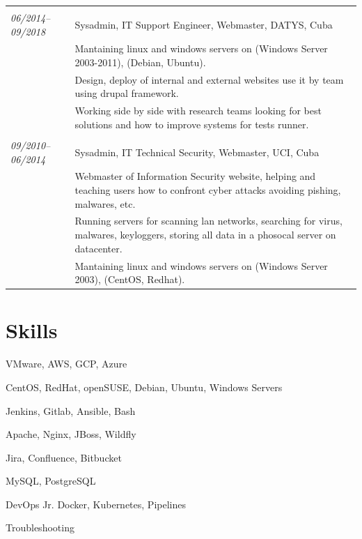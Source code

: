 \documentclass[a4paper,12pt]{article}
\begin{document}
\begin{tabular}{p{2.9cm}| p{16cm}}
\multicolumn{2}{c}{} \\  
\emph{06/2014–09/2018} & Sysadmin, IT Support Engineer, Webmaster, DATYS, Cuba \\
\textsc{}&\footnotesize{Mantaining linux and windows servers on (Windows Server 2003-2011), (Debian, Ubuntu).}\\
\textsc{}&\footnotesize{Design, deploy of internal and external websites use it by team using drupal framework.}\\
\textsc{}&\footnotesize{Working side by side with research teams looking for best solutions and how to improve systems for tests runner.}\\

\multicolumn{2}{c}{} \\  
\emph{09/2010–06/2014} & Sysadmin, IT Technical Security, Webmaster, UCI, Cuba \\
\textsc{}&\footnotesize{Webmaster of Information Security website, helping and teaching users how to confront cyber attacks avoiding pishing, malwares, etc.}\\
\textsc{}&\footnotesize{Running servers for scanning lan networks, searching for virus, malwares, keyloggers, storing all data in a phosocal server on datacenter.}\\
\textsc{}&\footnotesize{Mantaining linux and windows servers on (Windows Server 2003), (CentOS, Redhat).}\\
\end{tabular}


\section{Skills}
\justify
\begin{enumerate*}
	\item VMware, AWS, GCP, Azure \hspace{0.15cm}
	\item CentOS, RedHat, openSUSE, Debian, Ubuntu, Windows Servers \hspace{0.15cm}
	\item Jenkins, Gitlab, Ansible, Bash \hspace{0.15cm}
	\item Apache, Nginx, JBoss,  Wildfly \hspace{0.15cm}
	\item Jira, Confluence, Bitbucket \hspace{0.15cm}
	\item MySQL, PostgreSQL \hspace{0.15cm}
	\item DevOps Jr. Docker, Kubernetes, Pipelines \hspace{0.15cm}
	\item Troubleshooting
\end{enumerate*}
\end{document}
